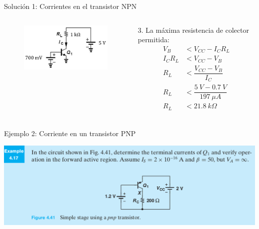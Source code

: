 \documentclass[t,aspectratio=169]{beamer}
\begin{document}
\begin{frame}{Solución 1: Corrientes en el transistor NPN}

\begin{columns}
\begin{column}{0.5\textwidth}

\begin{figure}
    \includegraphics[width=6cm]{figures/ejemplo_1.png}
\end{figure}

\end{column}
\begin{column}{0.5\textwidth}

3. La máxima resistencia de colector permitida:
%
\begin{align*}
V_B &< V_{CC} - I_C R_L \\
I_C R_L &< V_{CC} - V_B \\
R_L &< \dfrac{V_{CC} - V_B}{I_C} \\
R_L &< \dfrac{5\ V - 0.7\ V}{197\ \mu A} \\
R_L &< 21.8\ k\Omega \\
\end{align*}

\end{column}
\end{columns}
\end{frame}


\begin{frame}{Ejemplo 2: Corriente en un transistor PNP}

\includegraphics[width=\textwidth]{figures/ejemplo_2.png}

\end{frame}
\end{document}
